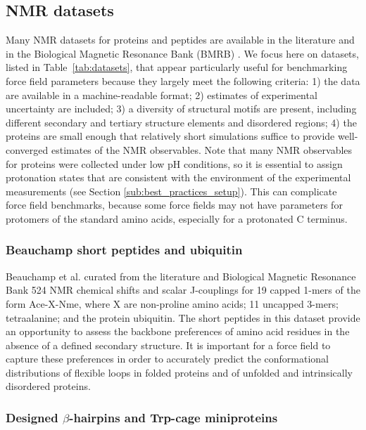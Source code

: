 \documentclass[9pt,review,pubversion]{livecoms}
\begin{document}
\subsection{NMR datasets}
\label{sub:nmr_data}

Many NMR datasets for proteins and peptides are available in the literature and in the Biological Magnetic Resonance Bank (BMRB) \cite{ulrich_biomagresbank_2008,romero_biomagresbank_2020}.
We focus here on datasets, listed in Table~\ref{tab:datasets}, that appear particularly useful for benchmarking force field parameters because they largely meet the following criteria: 1) the data are available in a machine-readable format; 2) estimates of experimental uncertainty are included; 3) a diversity of structural motifs are present, including different secondary and tertiary structure elements and disordered regions; 4) the proteins are small enough that relatively short simulations suffice to provide well-converged estimates of the NMR observables.
Note that many NMR observables for proteins were collected under low pH conditions, so it is essential to assign protonation states that are consistent with the environment of the experimental measurements (see Section \ref{sub:best_practices_setup}).
This can complicate force field benchmarks, because some force fields may not have parameters for protomers of the standard amino acids, especially for a protonated C terminus.

\subsubsection{Beauchamp short peptides and ubiquitin}
\label{sub2:beauchamp}

Beauchamp et al. \cite{beauchamp_are_2012} curated from the literature and Biological Magnetic Resonance Bank 524 NMR chemical shifts and scalar J-couplings for 19 capped 1-mers of the form Ace-X-Nme, where X are non-proline amino acids; 11 uncapped 3-mers; tetraalanine; and the protein ubiquitin.
The short peptides in this dataset provide an opportunity to assess the backbone preferences of amino acid residues in the absence of a defined secondary structure.
It is important for a force field to capture these preferences in order to accurately predict the conformational distributions of flexible loops in folded proteins and of unfolded and intrinsically disordered proteins.

\subsubsection{Designed $\beta$-hairpins and Trp-cage miniproteins}
\label{sub2:designed_beta}
\end{document}
